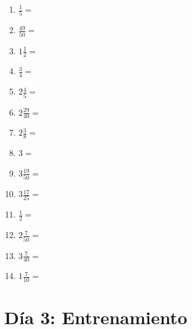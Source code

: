 \documentclass[12pt]{article}
\begin{document}
\begin{enumerate}
\item \large $ \frac{1}{5} = $ \vspace{1.5cm}
\item \large $ \frac{49}{50} = $ \vspace{1.5cm}
\item \large $ 1 \frac{1}{2} = $ \vspace{1.5cm}
\item \large $ \frac{3}{4} = $ \vspace{1.5cm}
\newpage
\item \large $ 2 \frac{4}{5} = $ \vspace{1.5cm}
\item \large $ 2 \frac{29}{40} = $ \vspace{1.5cm}
\item \large $ 2 \frac{3}{8} = $ \vspace{1.5cm}
\item \large $ 3 = $ \vspace{1.5cm}
\item \large $ 3 \frac{19}{50} = $ \vspace{1.5cm}
\item \large $ 3 \frac{17}{25} = $ \vspace{1.5cm}
\item \large $ \frac{1}{2} = $ \vspace{1.5cm}
\item \large $ 2 \frac{7}{50} = $ \vspace{1.5cm}
\item \large $ 3 \frac{7}{40} = $ \vspace{1.5cm}
\item \large $ 1 \frac{7}{10} = $ \vspace{1.5cm}
\end{enumerate}\newpage
\section*{Día 3: Entrenamiento}
\end{document}
